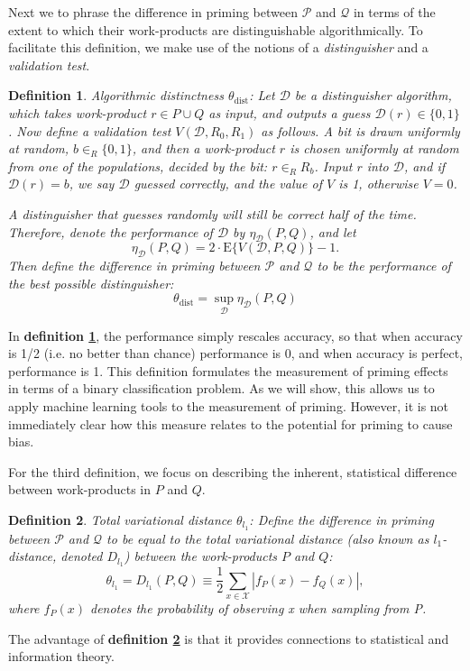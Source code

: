 \documentclass[12pt]{article}
\newtheorem{mydef}{Definition}
\begin{document}
Next we to phrase the difference in priming between $\mathcal{P}$ and
$\mathcal{Q}$ in terms of the extent to which their work-products are 
distinguishable algorithmically. To facilitate this definition, we make 
use of the notions of a \textit{distinguisher} and a \textit{validation test}.
\begin{mydef}
	{\upshape Algorithmic distinctness $\theta_\mathrm{dist}$:}
	Let $\mathcal{D}$ be a distinguisher algorithm, which takes work-product 
	$r \in P \cup Q$ as input, and outputs a \emph{guess} 
	$\mathcal{D}(r) \in \{0, 1\}$. Now define a validation test 
	$V(\mathcal{D}, R_0, R_1)$ as follows. A bit is drawn uniformly at random, 
	$b \in_R \{0, 1\}$, and then a work-product $r$ is chosen uniformly at 
	random from one of the populations, decided by the bit: $r \in_R R_b$. 
	Input $r$ into $\mathcal{D}$, and if $\mathcal{D}(r) = b$, we say 
	$\mathcal{D}$ \emph{guessed correctly}, and the value of $V$ is 1, 
	otherwise $V = 0$.

	A distinguisher that guesses randomly will still be correct half of the 
	time. Therefore, denote the performance of $\mathcal{D}$ by 
	$\eta_\mathcal{D}(P, Q)$, and let
	$$
		\eta_\mathcal{D}(P,Q) = 2\cdot \mathrm{E}\{V(\mathcal{D},P,Q)\} - 1.
	$$
	Then define the difference in priming between $\mathcal{P}$ and 
	$\mathcal{Q}$ to be the performance of the best possible distinguisher:
	$$ 
		\theta_\mathrm{dist} = \sup_\mathcal{D} \eta_\mathcal{D}(P,Q)
	$$
	\label{def:dist}
\end{mydef}
In \textbf{definition \ref{def:dist}}, the performance simply rescales 
accuracy, so that when
accuracy is 1/2 (i.e. no better than chance) performance is 0, and when 
accuracy is perfect, performance is 1. This definition formulates the 
measurement of 
priming effects in terms of a binary classification problem. As we will show,
this allows us to apply machine learning tools to the 
measurement of priming.  However, it is not immediately clear 
how this measure relates to the potential for priming to cause bias.

For the third definition, we focus on describing the inherent, statistical
difference between work-products in $P$ and $Q$.  
\begin{mydef}
	\label{def:l1}
	{\upshape Total variational distance $\theta_{l_1}$:}
	Define the difference in priming between $\mathcal{P}$ and $\mathcal{Q}$ 
	to be equal to the total variational distance (also known as 
	$l_1$-distance, denoted $D_{l_1}$) between the work-products $P$ and $Q$:
	$$
	\theta_{l_1} = D_{l_1}(P,Q) \equiv \frac{1}{2} \sum_{x \in \mathcal{X}} 
	\left| 
		f_P(x) - f_Q(x)
	\right|,
	$$
	where $f_P(x)$ denotes the probability of observing x when sampling from P.
\end{mydef}
The advantage of \textbf{definition \ref{def:l1}} is that it provides connections
to statistical and information theory.
\end{document}
